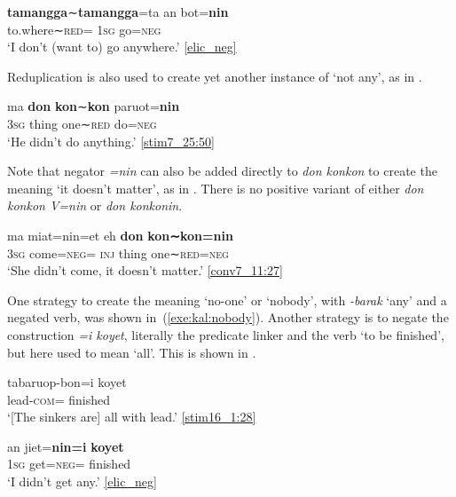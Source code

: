 \documentclass[output=paper,colorlinks,citecolor=brown,draft]{langscibook}
\begin{document}
\ex \label{exe:kal:nowhere}
{\gll \textbf{tamangga}∼\textbf{tamangga}=ta an bot=\textbf{nin}\\
	to.where∼\textsc{red}={\glta} \textsc{1sg} go=\textsc{neg}\\
	\glt `I don't (want to) go anywhere.' {\href{http://hdl.handle.net/10050/00-0000-0000-0004-1C60-A}{[elic\_neg]}}
}
\z \z

Reduplication is also used to create yet another instance of `not any', as in .


\ea \label{exe:kal:donkonkon}
\gll ma \textbf{don} \textbf{kon}∼\textbf{kon} paruot=\textbf{nin}\\
\textsc{3sg} thing one∼\textsc{red} do=\textsc{neg}\\
\glt `He didn't do anything.' {\href{http://hdl.handle.net/10050/00-0000-0000-0004-1BAA-C}{[stim7\_25:50]}}
\z 

Note that negator \textit{=nin} can also be added directly to \textit{don konkon} to create the meaning `it doesn't matter', as in . There is no positive variant of either \textit{don konkon V=nin} or \textit{don konkonin}.
   
\ea \label{exe:kal:donkonkonin}
\gll ma miat=nin=et eh \textbf{don} \textbf{kon∼kon=nin}\\
\textsc{3sg} come=\textsc{neg}={\glet} \textsc{inj} thing one∼\textsc{red=neg}\\
\glt `She didn't come, it doesn't matter.' {\href{http://hdl.handle.net/10050/00-0000-0000-0004-1BC3-B}{[conv7\_11:27]}}
\z 

One strategy to create the meaning `no-one' or `nobody', with \textit{-barak} `any' and a negated verb, was shown in~(\ref{exe:kal:nobody}). Another strategy is to negate the construction \textit{=i koyet}, literally the predicate linker and the verb `to be finished', but here used to mean `all'. This is shown in .

\ea \label{exe:kal:allnone}
\ea \label{exe:kal:all}
{\gll tabaruop-bon=i koyet\\
	lead-\textsc{com}={\gli} finished\\
	\glt `[The sinkers are] all with lead.' {\href{http://hdl.handle.net/10050/00-0000-0000-0004-1C76-B}{[stim16\_1:28]}}
}

\ex \label{exe:kal:none}
{\gll an jiet=\textbf{nin=i} \textbf{koyet}\\
	\textsc{1sg} get=\textsc{neg}={\gli} finished\\
	\glt `I didn't get any.' {\href{http://hdl.handle.net/10050/00-0000-0000-0004-1C60-A}{[elic\_neg]}}
}
\z \z
\end{document}
